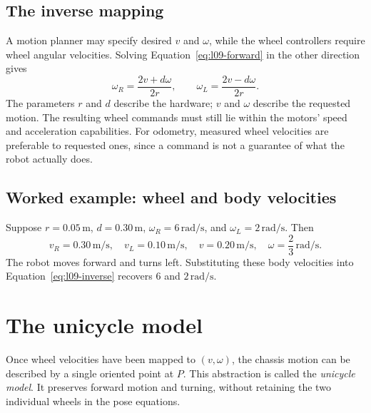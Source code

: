 \subsection{The inverse mapping}
A motion planner may specify desired $v$ and $\omega$, while the wheel
controllers require wheel angular velocities. Solving
Equation~\eqref{eq:l09-forward} in the other direction gives
\begin{equation}
 \boxed{\omega_R=\frac{2v+d\omega}{2r},\qquad
 \omega_L=\frac{2v-d\omega}{2r}.}
 \label{eq:l09-inverse}
\end{equation}
The parameters $r$ and $d$ describe the hardware; $v$ and $\omega$ describe
the requested motion. The resulting wheel commands must still lie within
the motors' speed and acceleration capabilities. For odometry, measured
wheel velocities are preferable to requested ones, since a command is not
a guarantee of what the robot actually does.

\subsection{Worked example: wheel and body velocities}
Suppose $r=0.05\,\mathrm m$, $d=0.30\,\mathrm m$,
$\omega_R=6\,\mathrm{rad/s}$, and $\omega_L=2\,\mathrm{rad/s}$.
Then
\[
 v_R=0.30\,\mathrm{m/s},\quad v_L=0.10\,\mathrm{m/s},\quad
 v=0.20\,\mathrm{m/s},\quad \omega=\frac23\,\mathrm{rad/s}.
\]
The robot moves forward and turns left. Substituting these body velocities
into Equation~\eqref{eq:l09-inverse} recovers $6$ and $2\,\mathrm{rad/s}$.

\section{The unicycle model}
Once wheel velocities have been mapped to $(v,\omega)$, the chassis motion
can be described by a single oriented point at $P$. This abstraction is
called the \emph{unicycle model}. It preserves forward motion and turning,
without retaining the two individual wheels in the pose equations.

